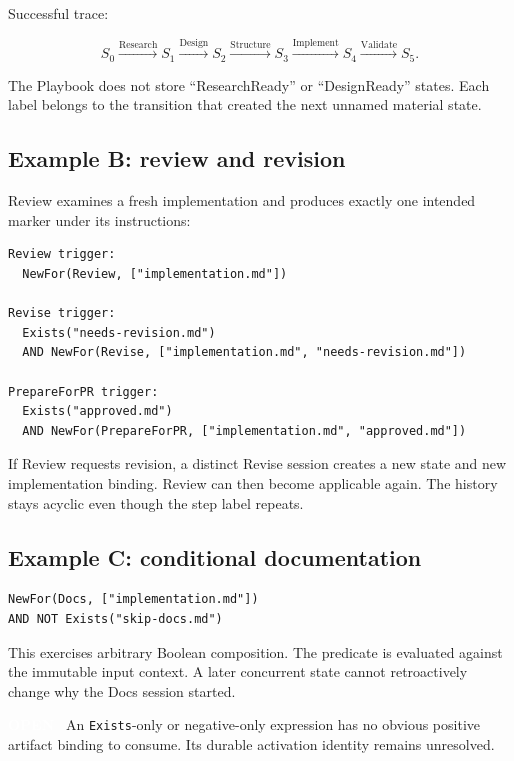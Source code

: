 \documentclass[11pt]{article}
\newcommand{\statuspill}[2]{%
  \begingroup\setlength{\fboxsep}{3pt}%
  \colorbox{#1}{\textcolor{white}{\sffamily\bfseries\scriptsize #2}}%
  \endgroup}
\newcommand{\Open}{\statuspill{Amber}{OPEN}}
\newcommand{\artifact}[1]{\texttt{#1}}
\begin{document}
Successful trace:

\begin{equation}
 S_0 \xrightarrow{\mathrm{Research}} S_1
     \xrightarrow{\mathrm{Design}} S_2
     \xrightarrow{\mathrm{Structure}} S_3
     \xrightarrow{\mathrm{Implement}} S_4
     \xrightarrow{\mathrm{Validate}} S_5.
\end{equation}

The Playbook does not store ``ResearchReady'' or ``DesignReady'' states. Each label belongs to the transition that created the next unnamed material state.

\subsection{Example B: review and revision}

Review examines a fresh implementation and produces exactly one intended marker under its instructions:

\begin{lstlisting}[style=playbook]
Review trigger:
  NewFor(Review, ["implementation.md"])

Revise trigger:
  Exists("needs-revision.md")
  AND NewFor(Revise, ["implementation.md", "needs-revision.md"])

PrepareForPR trigger:
  Exists("approved.md")
  AND NewFor(PrepareForPR, ["implementation.md", "approved.md"])
\end{lstlisting}

If Review requests revision, a distinct Revise session creates a new state and new implementation binding. Review can then become applicable again. The history stays acyclic even though the step label repeats.

\subsection{Example C: conditional documentation}

\begin{lstlisting}[style=playbook]
NewFor(Docs, ["implementation.md"])
AND NOT Exists("skip-docs.md")
\end{lstlisting}

This exercises arbitrary Boolean composition. The predicate is evaluated against the immutable input context. A later concurrent state cannot retroactively change why the Docs session started.

\Open\ An \artifact{Exists}-only or negative-only expression has no obvious positive artifact binding to consume. Its durable activation identity remains unresolved.
\end{document}
